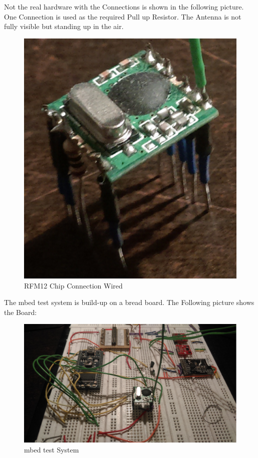 Not the real hardware with the Connections is shown in the following picture. One Connection is used as the required Pull up Resistor. The Antenna is not fully visible but standing up in the air.

\begin{figure}[H]
	\centering
		\includegraphics[width=1.00\textwidth]{picture/rfm12_connected.png}
	\caption{RFM12 Chip Connection Wired}
	\label{fig:rfm12_coonnection}
\end{figure}

The mbed test system is build-up on a bread board. The Following picture shows the Board: 

\begin{figure}[H]
	\centering
		\includegraphics[width=1.00\textwidth]{picture/mbed_build.png}
	\caption{mbed test System}
	\label{fig:rfm12}
\end{figure}

